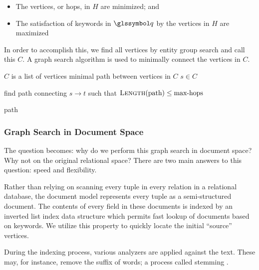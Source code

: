 			\begin{itemize}
				\item The vertices, or hops, in \(H\) are minimized; and
				\item The satisfaction of keywords in \(\q\) by the vertices in \(H\) are maximized
			\end{itemize}
			
			In order to accomplish this, we find all vertices by entity group search and call this \(C\).  A graph search algorithm is used to minimally connect the vertices in \(C\).
			
			\begin{algorithm}[!ht]
				\caption{\(\textsc{Graph-Search}(C)\)}
				\label{alg:graph-search}
				
				\begin{singlespaced}
					\begin{algorithmic}[1]
						\REQUIRE \(C\) is a list of vertices
						\ENSURE minimal path between vertices in \(C\)
						\medskip
						\STATE \(s \in C\)
						
							\STATE find path connecting \(s \rightarrow t\) such that \(\textsc{Length}(\text{path}) \le \text{max-hops}\)
						\ENDFOR
						
						\RETURN path
						\medskip
						\medskip
					\end{algorithmic}
				\end{singlespaced}
			\end{algorithm}
		
		\subsubsection{Graph Search in Document Space}
			The question becomes:  why do we perform this graph search in document space?  Why not on the original relational space?  There are two main answers to this question:  speed and flexibility.
			
			Rather than relying on scanning every tuple in every relation in a relational database, the document model represents every tuple as a semi-structured document.  The contents of every field in these documents is indexed by an inverted list index data structure which permits fast lookup of documents based on keywords.  We utilize this property to quickly locate the initial ``source'' vertices.
			
			During the indexing process, various analyzers are applied against the text.  These may, for instance, remove the suffix of words; a process called stemming \cite{porter-97}.
			
